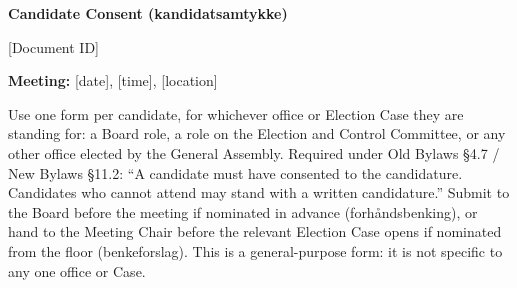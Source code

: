 \documentclass{../../Common/Latex/Templates/rapport}
\newcommand{\meetingline}{\textbf{Meeting:} [date], [time], [location]}
\begin{document}
\reportmainmatter
\small
\setlength{\parindent}{0pt}
\setlength{\tabcolsep}{6pt}
\renewcommand{\arraystretch}{1.2}

\begin{center}
  {\Large\bfseries Candidate Consent (kandidatsamtykke)}\par
  \vspace{0.15cm}
  {\normalsize [Document ID]}\par
  \vspace{0.1cm}
  {\small \meetingline}\par
\end{center}

\vspace{0.2cm}
Use one form per candidate, for whichever office or Election Case they are standing for: a Board role, a role on the Election and Control Committee, or any other office elected by the General Assembly. Required under Old Bylaws \S4.7 / New Bylaws \S11.2: ``A candidate must have consented to the candidature. Candidates who cannot attend may stand with a written candidature.'' Submit to the Board before the meeting if nominated in advance (forhåndsbenking), or hand to the Meeting Chair before the relevant Election Case opens if nominated from the floor (benkeforslag). This is a general-purpose form: it is not specific to any one office or Case.
\end{document}
